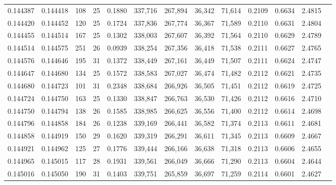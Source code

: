 \begin{tabular}{rrrrrrrrrrrrr}
0.144387 & 0.144418 & 108 &  25 &                                     0.1880 & 337,716 & 267,894 &  36,342 &  71,614 & 0.2109 & 0.6634 & 2.4815 \\
0.144420 & 0.144452 & 120 &  25 &                                     0.1724 & 337,836 & 267,774 &  36,367 &  71,589 & 0.2110 & 0.6631 & 2.4804 \\
0.144455 & 0.144514 & 167 &  25 &                                     0.1302 & 338,003 & 267,607 &  36,392 &  71,564 & 0.2110 & 0.6629 & 2.4789 \\
0.144514 & 0.144575 & 251 &  26 &                                     0.0939 & 338,254 & 267,356 &  36,418 &  71,538 & 0.2111 & 0.6627 & 2.4765 \\
0.144576 & 0.144646 & 195 &  31 &                                     0.1372 & 338,449 & 267,161 &  36,449 &  71,507 & 0.2111 & 0.6624 & 2.4747 \\
0.144647 & 0.144680 & 134 &  25 &                                     0.1572 & 338,583 & 267,027 &  36,474 &  71,482 & 0.2112 & 0.6621 & 2.4735 \\
0.144680 & 0.144723 & 101 &  31 &                                     0.2348 & 338,684 & 266,926 &  36,505 &  71,451 & 0.2112 & 0.6619 & 2.4725 \\
0.144724 & 0.144750 & 163 &  25 &                                     0.1330 & 338,847 & 266,763 &  36,530 &  71,426 & 0.2112 & 0.6616 & 2.4710 \\
0.144750 & 0.144794 & 138 &  26 &                                     0.1585 & 338,985 & 266,625 &  36,556 &  71,400 & 0.2112 & 0.6614 & 2.4698 \\
0.144796 & 0.144858 & 184 &  26 &                                     0.1238 & 339,169 & 266,441 &  36,582 &  71,374 & 0.2113 & 0.6611 & 2.4681 \\
0.144858 & 0.144919 & 150 &  29 &                                     0.1620 & 339,319 & 266,291 &  36,611 &  71,345 & 0.2113 & 0.6609 & 2.4667 \\
0.144921 & 0.144962 & 125 &  27 &                                     0.1776 & 339,444 & 266,166 &  36,638 &  71,318 & 0.2113 & 0.6606 & 2.4655 \\
0.144965 & 0.145015 & 117 &  28 &                                     0.1931 & 339,561 & 266,049 &  36,666 &  71,290 & 0.2113 & 0.6604 & 2.4644 \\
0.145016 & 0.145050 & 190 &  31 &                                     0.1403 & 339,751 & 265,859 &  36,697 &  71,259 & 0.2114 & 0.6601 & 2.4627 \\

\end{tabular}
